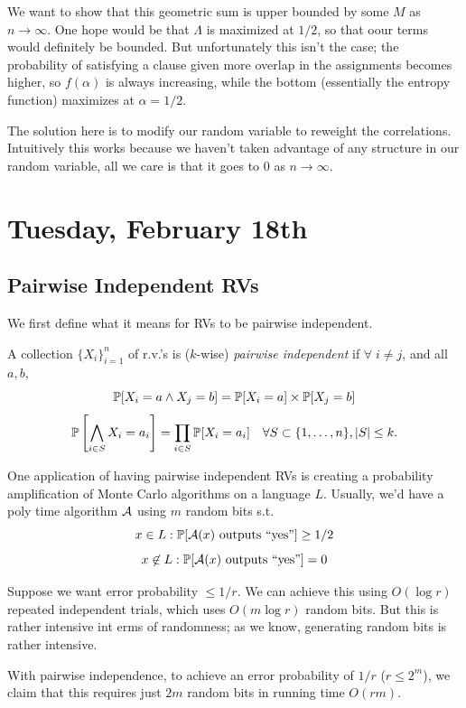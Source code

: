 \documentclass[11 pt]{scrartcl}
\begin{document}
        We want to show that this geometric sum is upper bounded by some $M$ as $n\to\infty$. One hope would be that $\Lambda$ is maximized at $1/2$, so that oour terms would definitely be bounded. But unfortunately this isn't the case; the probability of satisfying a clause given more overlap in the assignments becomes higher, so $f(\alpha)$ is always increasing, while the bottom (essentially the entropy function) maximizes at $\alpha = 1/2$. 

        The solution here is to modify our random variable to reweight the correlations. Intuitively this works because we haven't taken advantage of any structure in our random variable, all we care is that it goes to 0 as $n\to\infty$. 

        
\newpage
\section{Tuesday, February 18th}

\subsection{Pairwise Independent RVs}

We first define what it means for RVs to be pairwise independent. 

\begin{definition}
    A collection $\{X_i\}_{i=1}^n$ of r.v.'s is ($k$-wise) \emph{pairwise independent} if $\forall\; i\not= j$, and all $a,b$, 
    \[ \mathbb P[X_i = a \land X_j = b] = \mathbb P[X_i = a] \times \mathbb P[X_j = b] \] 
    \[ \mathbb P\left[\bigwedge_{i\in S} X_i = a_i \right] = \prod_{i\in S} \mathbb P[X_i = a_i] \quad \forall S \subset \{1, \dots, n\}, |S| \leq k.\] 
\end{definition}

One application of having pairwise independent RVs is creating a probability amplification of Monte Carlo algorithms on a language $L$. Usually, we'd have a poly time algorithm $\mathcal A$ using $m$ random bits s.t. 
    \[ x \in L: \mathbb P[\mathcal A(x) \text{ outputs ``yes''}] \geq 1/2 \] 
    \[ x \not\in L: \mathbb P[\mathcal A(x) \text{ outputs ``yes''}] = 0 \] 

    Suppose we want error probability $\leq 1/r$. We can achieve this using $O(\log r)$ repeated independent trials, which uses $O(m\log r)$ random bits. But this is rather intensive int erms of randomness; as we know, generating random bits is rather intensive. 

    With pairwise independence, to achieve an error probability of $1/r$ ($r \leq 2^m$), we claim that this requires just $2m$ random bits in running time $O(rm)$. 
\end{document}
